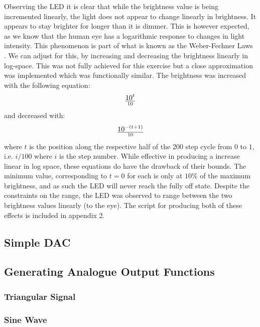 \documentclass[%
 reprint,
 amsmath,amssymb,
 aps,
]{revtex4-2}
\begin{document}
    Observing the LED it is clear that while the brightness value is being incremented linearly, the light does not appear to change linearly in brightness. It appears to stay brighter for longer than it is dimmer. This is however expected, as we know that the human eye has a logarithmic response to changes in light intensity. This phenomenon is part of what is known as the Weber-Fechner Laws \cite{maes_2021}. We can adjust for this, by increasing and decreasing the brightness linearly in log-space. This was not fully achieved for this exercise but a close approximation was implemented which was functionally similar. The brightness was increased with the following equation:
    \begin{equation}
        10^{t} \over 10
    \end{equation}and decreased with:
    \begin{equation}
        10^{-(t+1)} \over 10
    \end{equation}where $t$ is the position along the respective half of the 200 step cycle from $0$ to $1$, i.e. $i/100$ where $i$ is the step number. While effective in producing a increase linear in log space, these equations do have the drawback of their bounds. The minimum value, corresponding to $t=0$ for each is only at $10$\% of the maximum brightness, and as such the LED will never reach the fully off state. Despite the constraints on the range, the LED was observed to range between the two brightness values linearly (to the eye). The script for producing both of these effects is included in appendix 2.


    \subsection{Simple DAC}

    \subsection{Generating Analogue Output Functions}

        \subsubsection{Triangular Signal}

        \subsubsection{Sine Wave}
\end{document}

